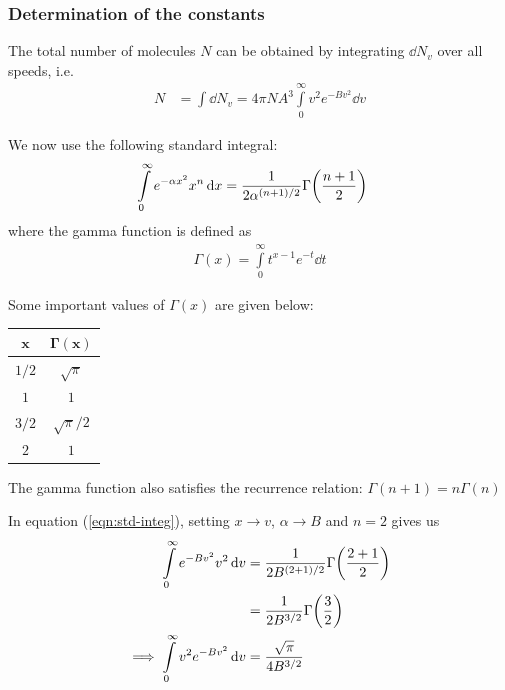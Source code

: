 		\subsubsection{Determination of the constants}
			\setcounter{equation}{0}
			The total number of molecules $N$ can be obtained by integrating $\dd{N_v}$ over all speeds, i.e.
			\begin{align}
				N&=\int{\dd{N_v}}=4\pi NA^3\int\limits_{0}^{\infty}{v^2e^{-Bv^2}\dd{v}} \label{eqn:total-molec-N}
			\end{align}
			
			We now use the following standard integral:
			\begin{align}
				\int\limits_{0}^{\infty}{e^{-\alpha x^2}x^n\dd{x}}&=\dfrac{1}{2\alpha^{(n+1)/2}}\Gamma\qty(\dfrac{n+1}{2}) \label{eqn:std-integ}
			\end{align}
			where the gamma function is defined as
			\begin{align*}
				\Gamma(x)=\int\limits_{0}^{\infty}{t^{x-1}e^{-t}\dd{t}}
			\end{align*}
			
			Some important values of $\Gamma(x)$ are given below:
			\begin{table}[h!]
				\centering
				\begin{tabular}{cc}
					\toprule[1.5pt]
					{$\boldsymbol{x}$} & {$\boldsymbol{\Gamma(x)}$} \\
					\midrule
					{$1/2$} & {$\sqrt{\pi}$} \\
					{$1$} & {$1$} \\
					{$3/2$} & {$\sqrt{\pi}/2$} \\
					{$2$} & {$1$} \\
					\bottomrule[1.5pt]
				\end{tabular}
			\end{table}
			
			The gamma function also satisfies the recurrence relation: $\Gamma(n+1)=n\Gamma(n)$
			
			In equation (\ref{eqn:std-integ}), setting $x\to v$, $\alpha\to B$ and $n=2$ gives us
			\begin{align}
				\int\limits_{0}^{\infty}{e^{-Bv^2}v^2\dd{v}}&=\dfrac{1}{2B^{(2+1)/2}}\Gamma\qty(\dfrac{2+1}{2}) \nonumber\\
					&=\dfrac{1}{2B^{3/2}}\Gamma\qty(\dfrac{3}{2}) \nonumber\\
				\implies\int\limits_{0}^{\infty}{v^2e^{-Bv^2}\dd{v}}&=\dfrac{\sqrt{\pi}}{4B^{3/2}} \label{eqn:integ-in-N}
			\end{align}
			
